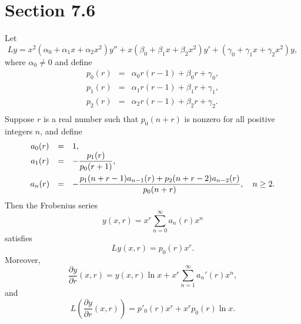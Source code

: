 \section*{Section 7.6}
\setcounter{chapter}{7}
\setcounter{section}{6}

\setcounter{theorem}{0}
\setcounter{equation}{1}
\begin{theorem}
  \label{thmtype:7.6.1} Let
  \begin{equation}
    \label{eq:7.6.2}Ly= x^{2}(\alpha_{0}+\alpha_{1}x+\alpha_{2}x^{2})y''+x(\beta_{0}+\beta_{1}x+\beta_{2}x^{2})y' +(\gamma_{0}+\gamma_{1}x+\gamma_{2}x^{2})y,
  \end{equation}
  where $\alpha_{0}\ne0$ and define
  \begin{eqnarray*}
    p_{0}(r)&=&\alpha_{0}r(r-1)+\beta_{0}r+\gamma_{0},\\[5pt] p_{1}(r)&=&\alpha_{1}r(r-1)+\beta_{1}r+\gamma_{1},\\[5pt] p_{2}(r)&=&\alpha_{2}r(r-1)+\beta_{2}r+\gamma_{2}.\\
  \end{eqnarray*}
  Suppose $r$ is a real number such that $p_{0}(n+r)$ is nonzero for all positive integers $n$, and
  define
  \[
    \begin{array}{ccl}
      a_{0}(r) & = & 1,                                                                                 \\
      a_{1}(r) & = & -\displaystyle\frac{p_{1}(r)}{p_{0}(r+1)},                                                  \\[10pt]
      a_{n}(r) & = & -\displaystyle\frac{p_{1}(n+r-1)a_{n-1}(r)+p_{2}(n+r-2)a_{n-2}(r)}{p_{0}(n+r)},\quad n\ge2.
    \end{array}
  \]
  Then the Frobenius series
  \begin{equation}
    \label{eq:7.6.3}y(x,r)=x^{r}\sum_{n=0}^{\infty}a_{n}(r)x^{n}
  \end{equation}
  satisfies
  \begin{equation}
    \label{eq:7.6.4}Ly(x,r)=p_{0}(r)x^{r}.
  \end{equation}
  Moreover,
  \begin{equation}
    \label{eq:7.6.5}\frac{\partial y}{\partial r}(x,r)=y(x,r)\ln x+x^{r}\sum_{n=1}^{\infty}a_{n}'(r)x^{n},
  \end{equation}
  and
  \begin{equation}
    \label{eq:7.6.6}L\left(\frac{\partial y}{\partial r}(x,r)\right)=p'_{0}(r)x^{r}+x^{r}p_{0}(r)\ln x.
  \end{equation}
\end{theorem}

